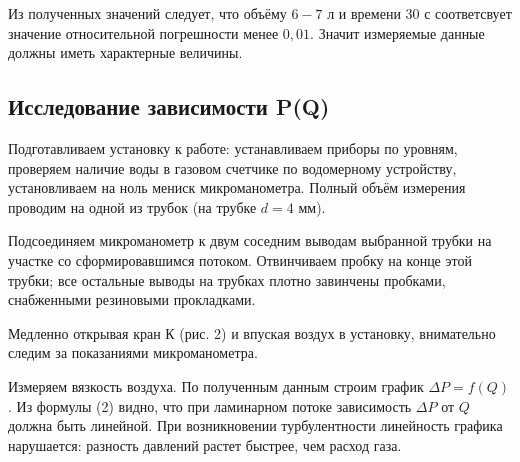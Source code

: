 \documentclass[a4paper, 12pt]{article} %
\begin{document}
Из полученных значений следует, что объёму $6-7$ л и времени $30$ с соответсвует значение относительной погрешности менее $0,01$. Значит измеряемые данные должны иметь характерные величины.

\subsection{Исследование зависимости P(Q)}

Подготавливаем установку к работе: устанавливаем приборы по уровням, проверяем наличие воды в газовом счетчике по водомерному устройству, установливаем на ноль мениск микроманометра. Полный объём измерения проводим на одной из трубок (на трубке $d = 4$ мм).

Подсоединяем микроманометр к двум соседним выводам выбранной трубки на участке со сформировавшимся потоком. Отвинчиваем пробку на конце этой трубки; все остальные выводы на трубках плотно завинчены пробками, снабженными резиновыми прокладками.

Медленно открывая кран К (рис. 2) и впуская воздух в установку, внимательно следим за показаниями микроманометра.

Измеряем вязкость воздуха. По полученным данным строим график $\Delta P = f(Q)$. Из формулы (2) видно, что при ламинарном потоке зависимость $\Delta P$ от $Q$ должна быть линейной. При возникновении турбулентности линейность графика нарушается: разность давлений растет быстрее, чем расход газа.
\end{document}
